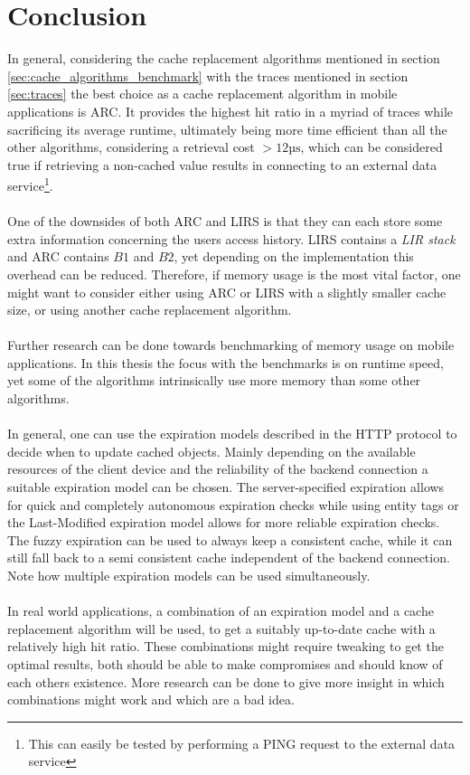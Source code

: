 \documentclass[pdftex,a4paper,12pt,twoside]{report}
\begin{document}
\chapter{Conclusion}
\label{ch:conclusion}
In general, considering the cache replacement algorithms mentioned in section \ref{sec:cache_algorithms_benchmark} with the traces mentioned in section \ref{sec:traces} the best choice as a cache replacement algorithm in mobile applications is ARC. It provides the highest hit ratio in a myriad of traces while sacrificing its average runtime, ultimately being more time efficient than all the other algorithms, considering a retrieval cost $> 12\text{µs}$, which can be considered true if retrieving a non-cached value results in connecting to an external data service\footnote{This can easily be tested by performing a PING request to the external data service}.
\\\\
One of the downsides of both ARC and LIRS is that they can each store some extra information concerning the users access history. LIRS contains a \emph{LIR stack} and ARC contains $B1$ and $B2$, yet depending on the implementation this overhead can be reduced. Therefore, if memory usage is the most vital factor, one might want to consider either using ARC or LIRS with a slightly smaller cache size, or using another cache replacement algorithm.
\\\\
Further research can be done towards benchmarking of memory usage on mobile applications. In this thesis the focus with the benchmarks is on runtime speed, yet some of the algorithms intrinsically use more memory than some other algorithms.
\\\\
In general, one can use the expiration models described in the HTTP protocol to decide when to update cached objects. Mainly depending on the available resources of the client device and the reliability of the backend connection a suitable expiration model can be chosen. The server-specified expiration allows for quick and completely autonomous expiration checks while using entity tags or the Last-Modified expiration model allows for more reliable expiration checks. The fuzzy expiration can be used to always keep a consistent cache, while it can still fall back to a semi consistent cache independent of the backend connection. Note how multiple expiration models can be used simultaneously.
\\\\
In real world applications, a combination of an expiration model and a cache replacement algorithm will be used, to get a suitably up-to-date cache with a relatively high hit ratio. These combinations might require tweaking to get the optimal results, both should be able to make compromises and should know of each others existence. More research can be done to give more insight in which combinations might work and which are a bad idea.
\end{document}
